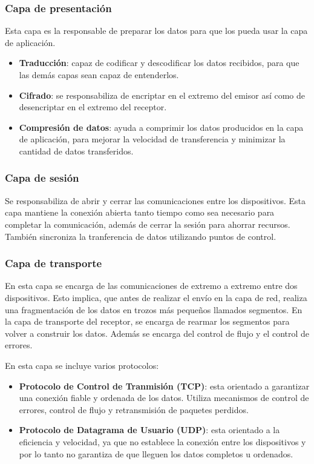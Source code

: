 \subsubsection{Capa de presentación}
\label{subsubsec:CapaPresentacion}
Esta capa es la responsable de preparar los datos para que los pueda usar la capa de aplicación.
\begin{itemize}
    \item \textbf{Traducción}: capaz de codificar y descodificar los datos recibidos, para que las demás capas sean capaz de entenderlos.
    \item \textbf{Cifrado}: se responsabiliza de encriptar en el extremo del emisor así como de desencriptar en el extremo del receptor.
    \item \textbf{Compresión de datos}: ayuda a comprimir los datos producidos en la capa de aplicación, para mejorar la velocidad de transferencia y minimizar la cantidad de datos transferidos.
\end{itemize}

\subsubsection{Capa de sesión}
\label{subsubsec:CapaSesion}
Se responsabiliza de abrir y cerrar las comunicaciones entre los dispositivos. Esta capa mantiene la conexión abierta tanto tiempo como sea necesario para completar la comunicación, además de cerrar la sesión para ahorrar recursos. También sincroniza la tranferencia de datos utilizando puntos de control.

\subsubsection{Capa de transporte}
\label{subsubsec:CapaTransporte}
En esta capa se encarga de las comunicaciones de extremo a extremo entre dos dispositivos. Esto implica, que antes de realizar el envío en la capa de red, realiza una fragmentación de los datos en trozos más pequeños llamados segmentos. En la capa de transporte del receptor, se encarga de rearmar los segmentos para volver a construir los datos. Además se encarga del control de flujo y el control de errores.

En esta capa se incluye varios protocolos:
\begin{itemize}
    \item \textbf{Protocolo de Control de Tranmisión (TCP)}: esta orientado a garantizar una conexión fiable y ordenada de los datos. Utiliza mecanismos de control de errores, control de flujo y retransmisión de paquetes perdidos.
    \item \textbf{Protocolo de Datagrama de Usuario (UDP)}: esta orientado a la eficiencia y velocidad, ya que no establece la conexión entre los dispositivos y por lo tanto no garantiza de que lleguen los datos completos u ordenados.
\end{itemize}

